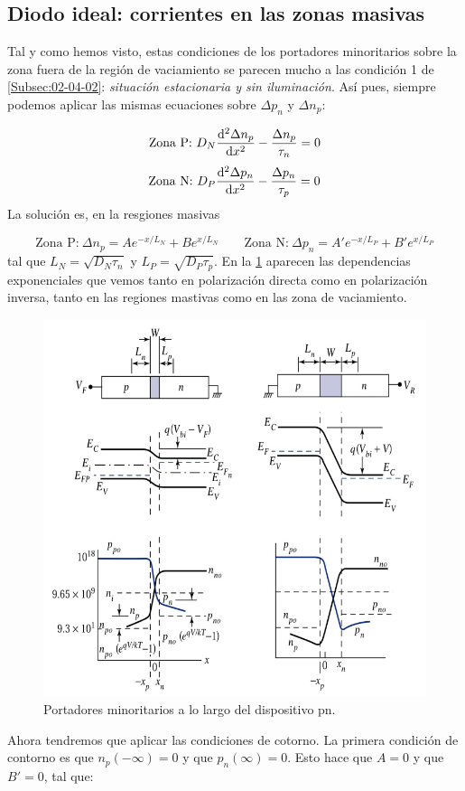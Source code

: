 \subsection{Diodo ideal: corrientes en las zonas masivas}

Tal y como hemos visto, estas condiciones de los portadores minoritarios sobre la zona fuera de la región de vaciamiento se parecen mucho a las condición 1 de \cref{Subsec:02-04-02}: \textit{situación estacionaria y sin iluminación}. Así pues, siempre podemos aplicar las mismas ecuaciones sobre $\Delta p_n$ y $\Delta n_p$:

\begin{equation}
    \text{Zona P:} \ D_N \frac{\mathrm{d} ^2 \Delta n_p}{\mathrm{d}  x^2} - \frac{\Delta n_p}{\tau_n} = 0 
\end{equation}
\begin{equation}
    \text{Zona N:} \ D_P \frac{\mathrm{d} ^2 \Delta p_n}{\mathrm{d}  x^2} - \frac{\Delta p_n}{\tau_p} = 0
\end{equation}
La solución es, en la resgiones masivas

\begin{equation}
    \text{Zona P:} \
    \Delta n_p = A e^{-x/L_N} + B e^{x/L_N} \qquad 
    \text{Zona N:}  \
    \Delta p_n = A' e^{-x/L_P} + B' e^{x/L_P}
\end{equation}
tal que $L_N=\sqrt{D_N\tau_n}$ y $L_P=\sqrt{D_P\tau_p}$. En la \cref{Fig:03_02} aparecen las dependencias exponenciales que vemos tanto en polarización directa como en polarización inversa, tanto en las regiones mastivas como en las zona de vaciamiento.
\begin{figure}[h!] \centering
    \includegraphics[width=0.6\linewidth]{Cuerpo/Ch_03/03_Temario_02.png}
    \caption{Portadores minoritarios a lo largo del dispositivo pn.}
    \label{Fig:03_02}
\end{figure}
Ahora tendremos que aplicar las condiciones de cotorno. La primera condición de contorno es que $n_p(-\infty)=0$ y que $p_n(\infty)=0$. Esto hace que $A=0$ y que $B'=0$, tal que:

